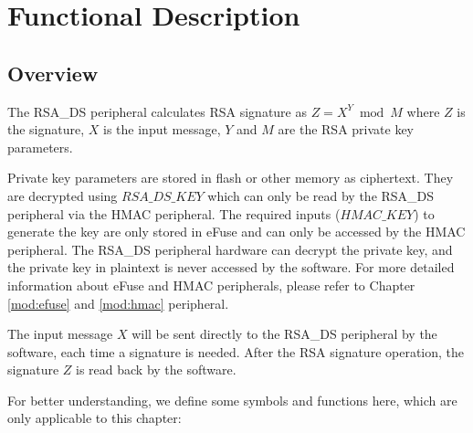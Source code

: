 \documentclass[main\_\_EN.tex]{subfiles}
\begin{document}
\section{Functional Description}
\subsection{Overview}

The RSA\_DS peripheral calculates RSA signature as \begin{math}Z = X^{Y} \bmod M\end{math} where \begin{math}Z\end{math} is the signature, \begin{math}X\end{math} is the input message, \begin{math}Y\end{math} and \begin{math}M\end{math} are the RSA private key parameters.

Private key parameters are stored in flash or other memory as ciphertext. They are decrypted using \begin{math} RSA\_DS\_KEY \end{math} which can only be read by the RSA\_DS peripheral via the HMAC peripheral. The required inputs (\begin{math} HMAC\_KEY \end{math}) to generate the key are only stored in eFuse and can only be accessed by the HMAC peripheral. The RSA\_DS peripheral hardware can decrypt the private key, and the private key in plaintext is never accessed by the software. For more detailed information about eFuse and HMAC peripherals, please refer to Chapter \ref{mod:efuse} \textit{} and \ref{mod:hmac} \textit{} peripheral.

The input message \begin{math}X\end{math} will be sent directly to the RSA\_DS peripheral by the software, each time a signature is needed. After the RSA signature operation, the signature \begin{math}Z\end{math} is read back by the software.

For better understanding, we define some symbols and functions here, which are only applicable to this chapter:
\end{document}
